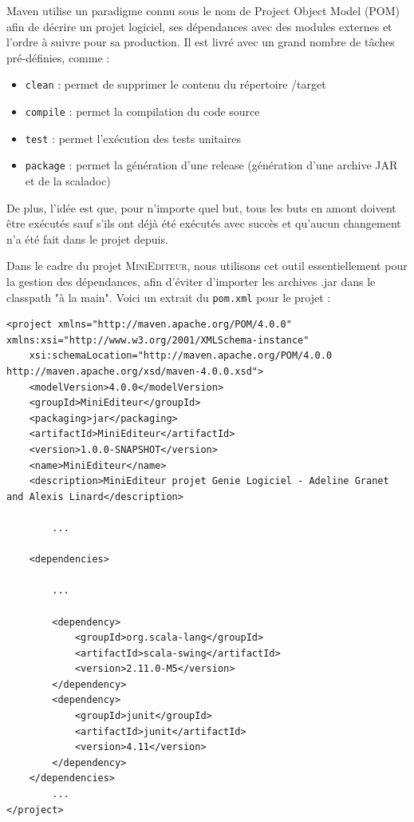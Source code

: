 \documentclass[a4paper,11pt]{article}
\begin{document}
Maven utilise un paradigme connu sous le nom de Project Object Model (POM) afin de décrire un projet logiciel, ses dépendances avec des modules externes et l'ordre à suivre pour sa production. Il est livré avec un grand nombre de tâches pré-définies, comme :
	\begin{itemize}
		\item \texttt{clean} : permet de supprimer le contenu du répertoire /target
		\item \texttt{compile} : permet la compilation du code source
    	\item \texttt{test} : permet l'exécution des tests unitaires
    	\item \texttt{package} : permet la génération d'une release (génération d'une archive JAR et de la scaladoc)
	\end{itemize}

De plus, l'idée est que, pour n'importe quel but, tous les buts en amont doivent être exécutés sauf s'ils ont déjà été exécutés avec succès et qu'aucun changement n'a été fait dans le projet depuis.


Dans le cadre du projet \textsc{MiniEditeur}, nous utilisons cet outil essentiellement pour la gestion des dépendances, afin d'éviter d'importer les archives .jar dans le classpath "à la main". Voici un extrait du \texttt{pom.xml} pour le projet :
\begin{lstlisting}[caption=Exemple de fichier pom.xml, label=ruleml]
<project xmlns="http://maven.apache.org/POM/4.0.0" xmlns:xsi="http://www.w3.org/2001/XMLSchema-instance"
	xsi:schemaLocation="http://maven.apache.org/POM/4.0.0 http://maven.apache.org/xsd/maven-4.0.0.xsd">
	<modelVersion>4.0.0</modelVersion>
	<groupId>MiniEditeur</groupId>
	<packaging>jar</packaging>
	<artifactId>MiniEditeur</artifactId>
	<version>1.0.0-SNAPSHOT</version>
	<name>MiniEditeur</name>
	<description>MiniEditeur projet Genie Logiciel - Adeline Granet and Alexis Linard</description>
	
		...
	
	<dependencies>
	
		...
	
		<dependency>
			<groupId>org.scala-lang</groupId>
			<artifactId>scala-swing</artifactId>
			<version>2.11.0-M5</version>
		</dependency>
		<dependency>
			<groupId>junit</groupId>
			<artifactId>junit</artifactId>
			<version>4.11</version>
		</dependency>
	</dependencies>
		...
</project>
\end{lstlisting}
\end{document}
